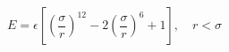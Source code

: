 


$$
 E = \epsilon \left[ \left(\frac{\sigma}{r}\right)^{12} - 
                       2\left(\frac{\sigma}{r}\right)^6 + 1\right]
                       , \quad r < \sigma
$$


